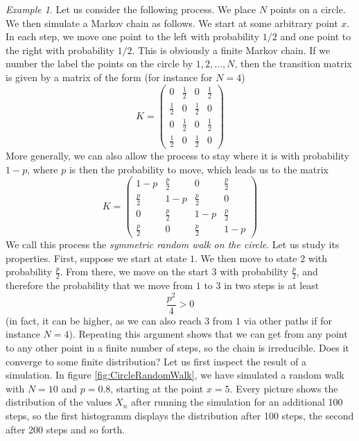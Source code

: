 \documentclass[a4paper, draft]{article}
\theoremstyle{own}
\theoremstyle{remark}
\newtheorem{example}{Example}[section]
\begin{document}
\begin{example}
Let us consider the following process. We place $N$ points on a circle. We then simulate a Markov chain as follows. We start at some arbitrary point $x$. In each step, we move one point to the left with probability $1/2$ and one point to the right with probability $1/2$. This is obviously a finite Markov chain. If we number the label the points on the circle by $1, 2, \dots, N$, then the transition matrix is given by a matrix of the form (for instance for $N=4$)
$$
K = 
\begin{pmatrix}
0 & \frac{1}{2} & 0 & \frac{1}{2} \\
\frac{1}{2} & 0 & \frac{1}{2} & 0 \\
0 & \frac{1}{2} & 0 & \frac{1}{2} \\
\frac{1}{2} & 0 & \frac{1}{2} & 0
\end{pmatrix}
$$
More generally, we can also allow the process to stay where it is with probability $1 - p$, where $p$ is then the probability to move, which leads us to the matrix
$$
K = 
\begin{pmatrix}
1-p & \frac{p}{2} & 0 & \frac{p}{2} \\
\frac{p}{2} & 1-p & \frac{p}{2} & 0 \\
0 & \frac{p}{2} & 1-p & \frac{p}{2} \\
\frac{p}{2} & 0 & \frac{p}{2} & 1 - p
\end{pmatrix}
$$
We call this process the {\em symmetric random walk on the circle}. Let us study its properties. First, suppose we start at state $1$. We then move to state $2$ with probability $\frac{p}{2}$. From there, we move on the start $3$ with probability 
$\frac{p}{2}$, and therefore the probability that we move from $1$ to $3$ in two steps is at least 
$$
\frac{p^2}{4} > 0 
$$
(in fact, it can be higher, as we can also reach $3$ from $1$ via other paths if for instance $N=4$). Repeating this argument shows that we can get from any point to any other point in a finite number of steps, so the chain is irreducible.
Does it converge to some finite distribution? Let us first inspect the result of a simulation. In figure \ref{fig:CircleRandomWalk}, we have simulated a random walk with $N = 10$ and $p=0.8$, starting at the point $x = 5$. Every picture shows the distribution of the values $X_n$ after running the simulation for an additional 100 steps, so the first histogramm displays the distribution after 100 steps, the second after 200 steps and so forth.


\end{example}
\end{document}
